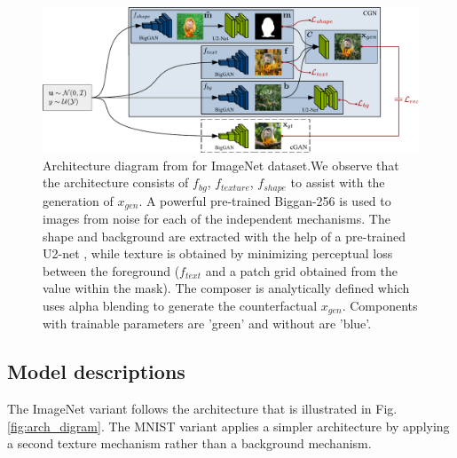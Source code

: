 \begin{figure}[H]
  \centering
  \includegraphics[width=0.9\linewidth]{../openreview/images/arch_diagram.pdf}
  \caption{Architecture diagram from \cite{sauer2021counterfactual} for ImageNet \cite{imagenet} dataset.We observe that the architecture consists of $f_{bg}$, $f_{texture}$, $f_{shape}$ to assist with the generation of $x_{gen}$. A powerful pre-trained Biggan-256 \cite{brock2019large} is used to images from noise for each of the independent mechanisms. The shape and background are extracted with the help of a pre-trained U2-net \cite{qin2020u2}, while texture is obtained by minimizing perceptual loss between the foreground ($f_{text}$ and a patch grid obtained from the value within the mask). The composer is analytically defined which uses alpha blending to generate the counterfactual $x_{gen}$. Components with trainable parameters are 'green' and without are 'blue'. 
  }
  \label{fig:arch_diagram}
\end{figure}




\subsection{Model descriptions}

The ImageNet variant follows the architecture that is illustrated in Fig. \ref{fig:arch_digram}. The MNIST variant applies a simpler architecture by applying a second texture mechanism rather than a background mechanism.


